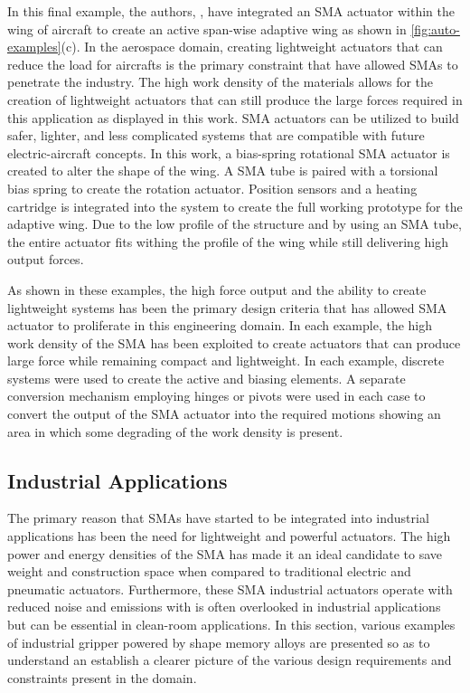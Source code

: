 In this final example, the authors, \todocite, have integrated an SMA actuator within the wing of aircraft to create an active span-wise adaptive wing as shown in \cref{fig:auto-examples}(c). In the aerospace domain, creating lightweight actuators that can reduce the load for aircrafts is the primary constraint that have allowed SMAs to penetrate the industry. The high work density of the materials allows for the creation of lightweight actuators that can still produce the large forces required in this application as displayed in this work. SMA actuators can be utilized to build safer, lighter, and less complicated systems that are compatible with future electric-aircraft concepts. In this work, a bias-spring rotational SMA actuator is created to alter the shape of the wing. A SMA tube is paired with a torsional bias spring to create the rotation actuator. Position sensors and a heating cartridge is integrated into the system to create the full working prototype for the adaptive wing. Due to the low profile of the structure and by using an SMA tube, the entire actuator fits withing the profile of the wing while still delivering high output forces.

As shown in these examples, the high force output and the ability to create lightweight systems has been the primary design criteria that has allowed SMA actuator to proliferate in this engineering domain. In each example, the high work density of the SMA has been exploited to create actuators that can produce large force while remaining compact and lightweight. In each example, discrete systems were used to create the active and biasing elements. A separate conversion mechanism employing hinges or pivots were used in each case to convert the output of the SMA actuator into the required motions showing an area in which some degrading of the work density is present.

\subsection{Industrial Applications}
The primary reason that SMAs have started to be integrated into industrial applications has been the need for lightweight and powerful actuators. The high power and energy densities of the SMA has made it an ideal candidate to save weight and construction space when compared to traditional electric and pneumatic actuators. Furthermore, these SMA industrial actuators operate with reduced noise and emissions with is often overlooked in industrial applications but can be essential in clean-room applications. In this section, various examples of industrial gripper powered by shape memory alloys are presented so as to understand an establish a clearer picture of the various design requirements and constraints present in the domain.

